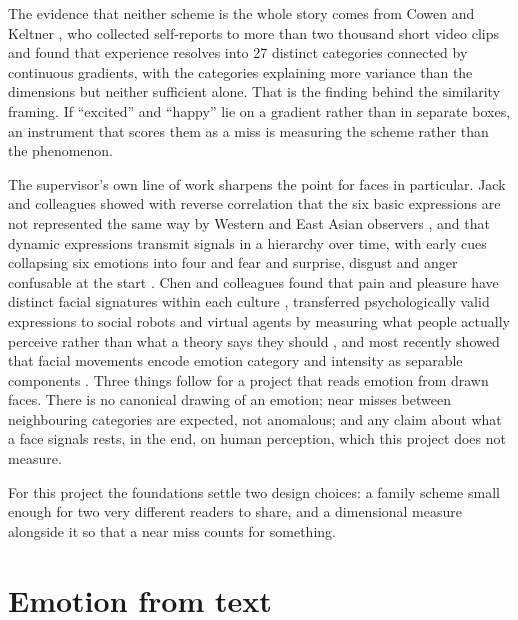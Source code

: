 The evidence that neither scheme is the whole story comes from Cowen and Keltner \cite{cowen2017self}, who collected self-reports to more than two thousand short video clips and found that experience resolves into 27 distinct categories connected by continuous gradients, with the categories explaining more variance than the dimensions but neither sufficient alone. That is the finding behind the similarity framing. If ``excited'' and ``happy'' lie on a gradient rather than in separate boxes, an instrument that scores them as a miss is measuring the scheme rather than the phenomenon.

The supervisor's own line of work sharpens the point for faces in particular. Jack and colleagues showed with reverse correlation that the six basic expressions are not represented the same way by Western and East Asian observers \cite{jack2012facial}, and that dynamic expressions transmit signals in a hierarchy over time, with early cues collapsing six emotions into four and fear and surprise, disgust and anger confusable at the start \cite{jack2014dynamic}. Chen and colleagues found that pain and pleasure have distinct facial signatures within each culture \cite{chen2018distinct}, transferred psychologically valid expressions to social robots and virtual agents by measuring what people actually perceive rather than what a theory says they should \cite{chen2018reverse, chen2020building}, and most recently showed that facial movements encode emotion category and intensity as separable components \cite{chen2024cultural}. Three things follow for a project that reads emotion from drawn faces. There is no canonical drawing of an emotion; near misses between neighbouring categories are expected, not anomalous; and any claim about what a face signals rests, in the end, on human perception, which this project does not measure.

For this project the foundations settle two design choices: a family scheme small enough for two very different readers to share, and a dimensional measure alongside it so that a near miss counts for something.

\section{Emotion from text}
\label{sec:lit-text}

